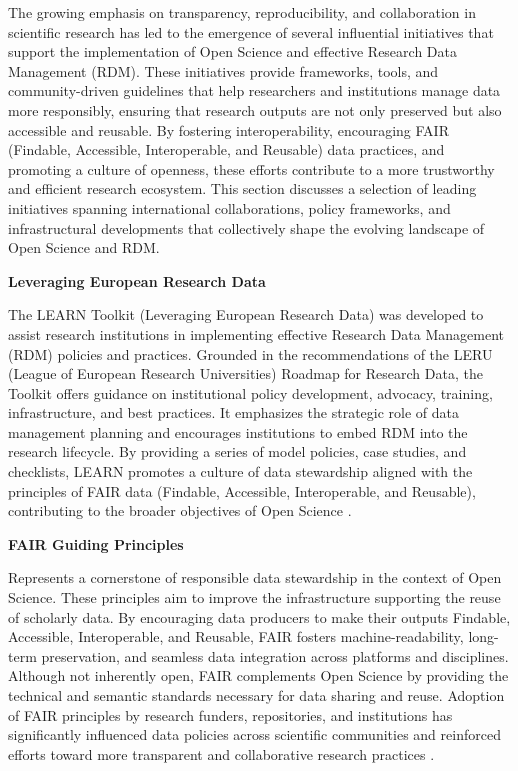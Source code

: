 \documentclass[final]{rc-book-2.14}
\begin{document}
The growing emphasis on transparency, reproducibility, and collaboration in scientific research has led to the emergence of several influential initiatives that support the implementation of Open Science and effective Research Data Management (RDM). These initiatives provide frameworks, tools, and community-driven guidelines that help researchers and institutions manage data more responsibly, ensuring that research outputs are not only preserved but also accessible and reusable. By fostering interoperability, encouraging FAIR (Findable, Accessible, Interoperable, and Reusable) data practices, and promoting a culture of openness, these efforts contribute to a more trustworthy and efficient research ecosystem. This section discusses a selection of leading initiatives spanning international collaborations, policy frameworks, and infrastructural developments that collectively shape the evolving landscape of Open Science and RDM.

\textbf{Leveraging European Research Data}

The LEARN Toolkit (Leveraging European Research Data) was developed to assist research institutions in implementing effective Research Data Management (RDM) policies and practices. Grounded in the recommendations of the LERU (League of European Research Universities) Roadmap for Research Data, the Toolkit offers guidance on institutional policy development, advocacy, training, infrastructure, and best practices. It emphasizes the strategic role of data management planning and encourages institutions to embed RDM into the research lifecycle. By providing a series of model policies, case studies, and checklists, LEARN promotes a culture of data stewardship aligned with the principles of FAIR data (Findable, Accessible, Interoperable, and Reusable), contributing to the broader objectives of Open Science \cite{learn_2017}.

\textbf{FAIR Guiding Principles} 

Represents a cornerstone of responsible data stewardship in the context of Open Science. These principles aim to improve the infrastructure supporting the reuse of scholarly data. By encouraging data producers to make their outputs Findable, Accessible, Interoperable, and Reusable, FAIR fosters machine-readability, long-term preservation, and seamless data integration across platforms and disciplines. Although not inherently open, FAIR complements Open Science by providing the technical and semantic standards necessary for data sharing and reuse. Adoption of FAIR principles by research funders, repositories, and institutions has significantly influenced data policies across scientific communities and reinforced efforts toward more transparent and collaborative research practices \cite{wilkinson_fair_2016}.
\end{document}
